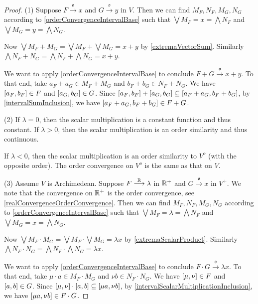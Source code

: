 \begin{proof}
(1) Suppose $F\overset{\mathfrak{o}}{\longrightarrow} x$ and $G\overset{\mathfrak{o}}{\longrightarrow} y$ in $V$. Then we can find $M_F, N_F, M_G, N_G$ according to \ref{orderConvergenceIntervalBase} such that $\bigvee M_F = x = \bigwedge N_F$ and $\bigvee M_G = y = \bigwedge N_G$.

Now $\bigvee M_F + M_G = \bigvee M_F + \bigvee M_G = x+y$ by \ref{extremaVectorSum}. Similarly $\bigwedge N_F + N_G = \bigwedge N_F + \bigwedge N_G = x+y$.

We want to apply \ref{orderConvergenceIntervalBase} to conclude $F+G \overset{\mathfrak{o}}{\longrightarrow} x + y$. To that end, take $a_F + a_G \in M_F+ M_G$ and $b_F + b_G \in N_F + N_G$.
We have $\interval{a_F, b_F}\in F$ and $\interval{a_G, b_G} \in G$. Since $\interval{a_F, b_F} + \interval{a_G, b_G} \subseteq \interval{a_F + a_G, b_F + b_G}$, by \ref{intervalSumInclusion}, we have $\interval{a_F + a_G, b_F + b_G} \in F+G$.

(2) If $\lambda = 0$, then the scalar multiplication is a constant function and thus constant. If $\lambda > 0$, then the scalar multiplication is an order similarity and thus continuous.

If $\lambda < 0$, then the scalar multiplication is an order similarity to $V^o$ (with the opposite order). The order convergence on $V^o$ is the same as that on $V$.

(3) Assume $V$ is Archimedean. Suppose $F\overset{\mathbb{R}}{\longrightarrow} \lambda$ in $\mathbb{R}^+$ and $G\overset{\mathfrak{o}}{\longrightarrow} x$ in $V^+$. We note that the convergence on $\mathbb{R}^+$ is the order convergence, see \ref{realConvergenceOrderConvergence}. Then we can find $M_F, N_F, M_G, N_G$ according to \ref{orderConvergenceIntervalBase} such that $\bigvee M_F = \lambda = \bigwedge N_F$ and $\bigvee M_G = x = \bigwedge N_G$.

Now $\bigvee M_F \cdot M_G = \bigvee M_F \cdot \bigvee M_G = \lambda x$ by \ref{extremaScalarProduct}. Similarly $\bigwedge N_F \cdot N_G = \bigwedge N_F \cdot \bigwedge N_G = \lambda x$.

We want to apply \ref{orderConvergenceIntervalBase} to conclude $F\cdot G \overset{\mathfrak{o}}{\longrightarrow} \lambda x$. To that end, take $\mu \cdot a \in M_F \cdot M_G$ and $\nu b \in N_F \cdot N_G$.
We have $\interval{\mu, \nu}\in F$ and $\interval{a, b} \in G$. Since $\interval{\mu, \nu} \cdot \interval{a, b} \subseteq \interval{\mu a, \nu b}$, by \ref{intervalScalarMultiplicationInclusion}, we have $\interval{\mu a, \nu b} \in F\cdot G$.
\end{proof}

